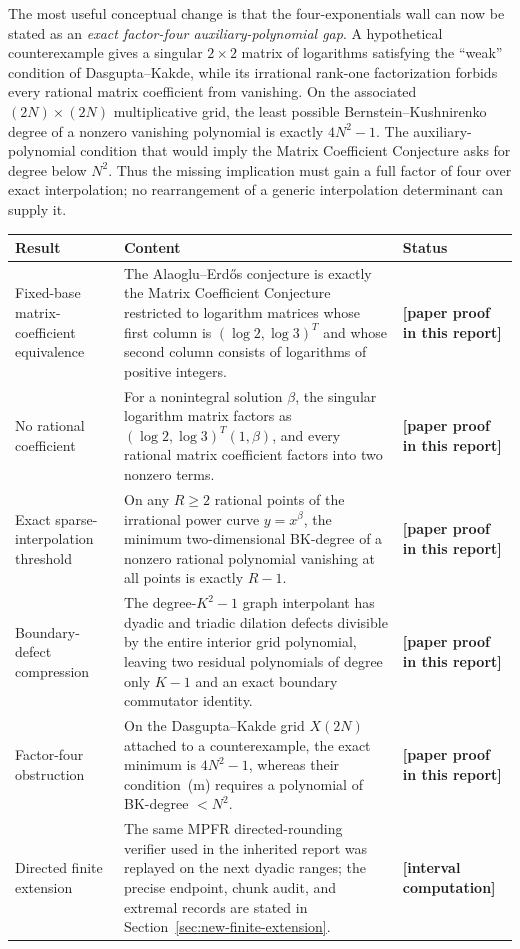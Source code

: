 \documentclass[11pt,oneside]{article}
\theoremstyle{definition}
\theoremstyle{remark}
\newcommand{\statusnew}{\textcolor{newgreen}{\textbf{[paper proof in this report]}}}
\newcommand{\statuscomp}{\textcolor{computeviolet}{\textbf{[interval computation]}}}
\begin{document}
The most useful conceptual change is that the four-exponentials wall can now be stated as an
\emph{exact factor-four auxiliary-polynomial gap}.  A hypothetical counterexample gives a
singular $2\times2$ matrix of logarithms satisfying the ``weak'' condition of
Dasgupta--Kakde, while its irrational rank-one factorization forbids every rational matrix
coefficient from vanishing.  On the associated $(2N)\times(2N)$ multiplicative grid, the
least possible Bernstein--Kushnirenko degree of a nonzero vanishing polynomial is exactly
$4N^2-1$.  The auxiliary-polynomial condition that would imply the Matrix Coefficient
Conjecture asks for degree below $N^2$.  Thus the missing implication must gain a full factor
of four over exact interpolation; no rearrangement of a generic interpolation determinant can
supply it.

\begin{center}
\begin{tabularx}{0.96\textwidth}{@{}>{\raggedright\arraybackslash}p{}X>{\raggedright\arraybackslash}p{}@{}}
\toprule
Result & Content & Status\\
\midrule
Fixed-base matrix-coefficient equivalence & The Alaoglu--Erd\H{o}s conjecture is exactly the Matrix Coefficient Conjecture restricted to logarithm matrices whose first column is $(\log2,\log3)^T$ and whose second column consists of logarithms of positive integers. & \statusnew\\
\addlinespace
No rational coefficient & For a nonintegral solution $\beta$, the singular logarithm matrix factors as $(\log2,\log3)^T(1,\beta)$, and every rational matrix coefficient factors into two nonzero terms. & \statusnew\\
\addlinespace
Exact sparse-interpolation threshold & On any $R\ge2$ rational points of the irrational power curve $y=x^\beta$, the minimum two-dimensional BK-degree of a nonzero rational polynomial vanishing at all points is exactly $R-1$. & \statusnew\\
\addlinespace
Boundary-defect compression & The degree-$K^2-1$ graph interpolant has dyadic and triadic dilation defects divisible by the entire interior grid polynomial, leaving two residual polynomials of degree only $K-1$ and an exact boundary commutator identity. & \statusnew\\
\addlinespace
Factor-four obstruction & On the Dasgupta--Kakde grid $X(2N)$ attached to a counterexample, the exact minimum is $4N^2-1$, whereas their condition~(m) requires a polynomial of BK-degree $<N^2$. & \statusnew\\
\addlinespace
Directed finite extension & The same MPFR directed-rounding verifier used in the inherited report was replayed on the next dyadic ranges; the precise endpoint, chunk audit, and extremal records are stated in Section~\ref{sec:new-finite-extension}. & \statuscomp\\
\bottomrule
\end{tabularx}
\end{center}
\end{document}
